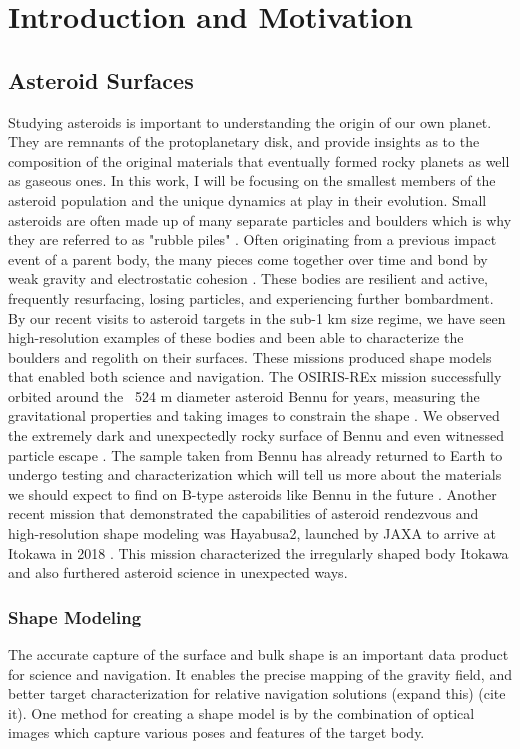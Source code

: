 \chapter{Introduction and Motivation}
\label{introchap}
\section{Asteroid Surfaces} 
Studying asteroids is important to understanding the origin of our own planet. They are remnants of the protoplanetary disk, and provide insights as to the composition of the original materials that eventually formed rocky planets as well as gaseous ones. In this work, I will be focusing on the smallest members of the asteroid population and the unique dynamics at play in their evolution.
Small asteroids are often made up of many separate particles and boulders which is why they are referred to as "rubble piles" \cite{Scheeres2018}. Often originating from a previous impact event of a parent body, the many pieces come together over time and bond by weak gravity and electrostatic cohesion \cite{Walsh2018}. These bodies are resilient and active, frequently resurfacing, losing particles, and experiencing further bombardment. By our recent visits to asteroid targets in the sub-1 km size regime, we have seen high-resolution examples of these bodies and been able to characterize the boulders and regolith on their surfaces. These missions produced shape models that enabled both science and navigation. The OSIRIS-REx mission successfully orbited around the ~524 m diameter asteroid Bennu for years, measuring the gravitational properties and taking images to constrain the shape \cite{Scheeres2019}. We observed the extremely dark and unexpectedly rocky surface of Bennu and even witnessed particle escape \cite{Hergenrother2019}. The sample taken from Bennu has already returned to Earth to undergo testing and characterization which will tell us more about the materials we should expect to find on B-type asteroids like Bennu in the future \cite{Lauretta2023}. Another recent mission that demonstrated the capabilities of asteroid rendezvous and high-resolution shape modeling was Hayabusa2, launched by JAXA to arrive at Itokawa in 2018 \cite{Watanabe2019}. This mission characterized the irregularly shaped body Itokawa and also furthered asteroid science in unexpected ways.

\subsection{Shape Modeling}
The accurate capture of the surface and bulk shape is an important data product for science and navigation. It enables the precise mapping of the gravity field, and better target characterization for relative navigation solutions (expand this) (cite it). One method for creating a shape model is by the combination of optical images which capture various poses and features of the target body. 


